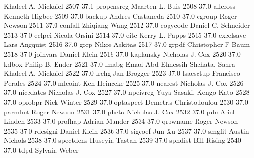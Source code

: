                                    Khaleel A. Mickaiel                     
  2507     37.1    propcnsreg    Maarten L. Buis                         
  2508     37.0    allcross      Kenneth Higbee                          
  2509     37.0    backup        Andres Castaneda                        
  2510     37.0    cgroup        Roger Newson                            
  2511     37.0    confall       Zhiqiang Wang                           
  2512     37.0    copycode      Daniel C. Schneider                     
  2513     37.0    eclpci        Nicola Orsini                           
  2514     37.0    eitc          Kerry L. Papps                          
  2515     37.0    excelsave     Lars Angquist                           
  2516     37.0    grep          Nikos Askitas                           
  2517     37.0    grpdf         Christopher F Baum                      
  2518     37.0    joinvars      Daniel Klein                            
  2519     37.0    kaplansky     Nicholas J. Cox                         
  2520     37.0    kdbox         Philip B. Ender                         
  2521     37.0    lmabg         Emad Abd Elmessih Shehata, Sahra        
                                   Khaleel A. Mickaiel                     
  2522     37.0    lrchg         Jan Brogger                             
  2523     37.0    lsacsetup     Francisco Perales                       
  2524     37.0    mlcoint       Ken Heinecke                            
  2525     37.0    nearest       Nicholas J. Cox                         
  2526     37.0    nicedates     Nicholas J. Cox                         
  2527     37.0    npeivreg      Yuya Sasaki, Kengo Kato                 
  2528     37.0    oprobpr       Nick Winter                             
  2529     37.0    optaspect     Demetris Christodoulou                  
  2530     37.0    parmhet       Roger Newson                            
  2531     37.0    pbeta         Nicholas J. Cox                         
  2532     37.0    pdc           Ariel Linden                            
  2533     37.0    profhap       Adrian Mander                           
  2534     37.0    qrowname      Roger Newson                            
  2535     37.0    rdesigni      Daniel Klein                            
  2536     37.0    sigcoef       Jun Xu                                  
  2537     37.0    smgfit        Austin Nichols                          
  2538     37.0    spectdens     Huseyin Tastan                          
  2539     37.0    sphdist       Bill Rising                             
  2540     37.0    tdpd          Sylvain Weber                           
